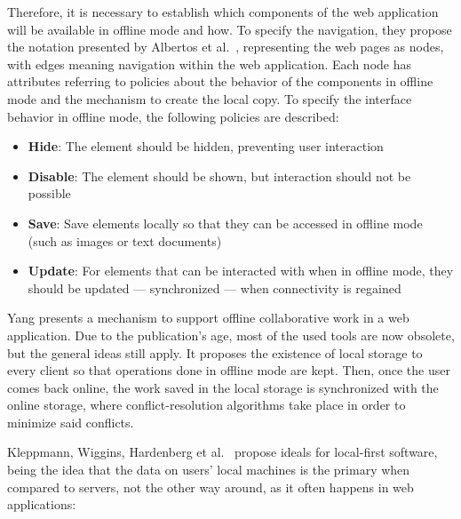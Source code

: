 Therefore, it is necessary to establish which components of the web application will be available in offline mode and how.
To specify the navigation, they propose the notation presented by Albertos et al.\ \cite{Penichet2013}, representing the web pages as nodes, with edges meaning navigation within the web application. Each node has attributes referring to policies about the behavior of the components in offline mode and the mechanism to create the local copy. To specify the interface behavior in offline mode, the following policies are described:

\begin{itemize}
    \item \textbf{Hide}: The element should be hidden, preventing user interaction
    \item \textbf{Disable}: The element should be shown, but interaction should not be possible
    \item \textbf{Save}: Save elements locally so that they can be accessed in offline mode (such as images or text documents)
    \item \textbf{Update}: For elements that can be interacted with when in offline mode, they should be updated --- synchronized --- when connectivity is regained
\end{itemize}

Yang \cite{Yang2000} presents a mechanism to support offline collaborative work in a web application. Due to the publication's age, most of the used tools are now obsolete, but the general ideas still apply. It proposes the existence of local storage to every client so that operations done in offline mode are kept. Then, once the user comes back online, the work saved in the local storage is synchronized with the online storage, where conflict-resolution algorithms take place in order to minimize said conflicts.

Kleppmann, Wiggins, Hardenberg et al.\ \cite{Kleppmann2019} propose ideals for local-first software, being the idea that the data on users' local machines is the primary when compared to servers, not the other way around, as it often happens in web applications:

